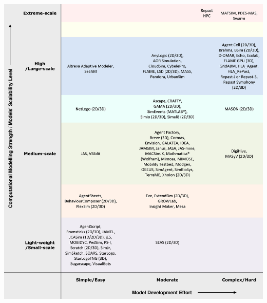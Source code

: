 \begin{minipage}{\linewidth}
    \centering
    \includegraphics[scale=0.9]{img/1-s2.0-S1574013716301198-gr1_lrg.jpg}
    \label{fig:Comparative_table}
\end{minipage}